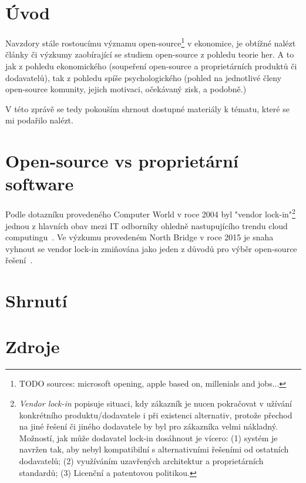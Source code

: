 %
%

\section{Úvod}
Navzdory stále rostoucímu významu open-source\footnote{TODO sources: microsoft opening, apple based on, millenials and jobs...} v ekonomice, je obtížné nalézt články či výzkumy zaobírající se studiem open-source z pohledu teorie her. A to jak z pohledu ekonomického (soupeření open-source a proprietárních produktů či dodavatelů), tak z pohledu spíše psychologického (pohled na jednotlivé členy open-source komunity, jejich motivaci, očekávaný zisk, a podobně.)

V této zprávě se tedy pokouším shrnout dostupné materiály k tématu, které se mi podařilo nalézt.

\section{Open-source vs proprietární software}
Podle dotazníku provedeného Computer World v roce 2004 byl "vendor lock-in"\footnote{{\em Vendor lock-in} popisuje situaci, kdy zákazník je nucen pokračovat v užívání konkrétního produktu/dodavatele i při existenci alternativ, protože přechod na jiné řešení či jiného dodavatele by byl pro zákazníka velmi nákladný. Možností, jak může dodavatel lock-in dosáhnout je vícero: (1) systém je navržen tak, aby nebyl kompatibilní s alternativními řešeními od ostatních dodavatelů; (2) využíváním uzavřených architektur a proprietárních standardů; (3) Licenční a patentovou politikou.} jednou z hlavních obav mezi IT odborníky ohledně nastupujícího trendu cloud computingu~\cite{computer-world-2004}. Ve výzkumu provedeném North Bridge v roce 2015 je snaha vyhnout se vendor lock-in zmiňována jako jeden z důvodů pro výběr open-source řešení~\cite{survey-2015}.



\section{Shrnutí}







\section{Zdroje}
%



